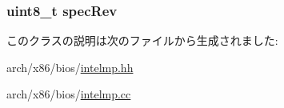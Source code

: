 \label{classX86ISA_1_1IntelMP_1_1ConfigTable_a0a2d9cdd770f9baaf77aee1519540efa}
\hypertarget{classX86ISA_1_1IntelMP_1_1ConfigTable_a56f76c52b1f369ed1502d8ed9d6e4027}{
\subsubsection[{specRev}]{\setlength{\rightskip}{0pt plus 5cm}uint8\_\-t {\bf specRev}}}
\label{classX86ISA_1_1IntelMP_1_1ConfigTable_a56f76c52b1f369ed1502d8ed9d6e4027}


このクラスの説明は次のファイルから生成されました:\begin{DoxyCompactItemize}
\item 
arch/x86/bios/\hyperlink{intelmp_8hh}{intelmp.hh}\item 
arch/x86/bios/\hyperlink{intelmp_8cc}{intelmp.cc}\end{DoxyCompactItemize}
